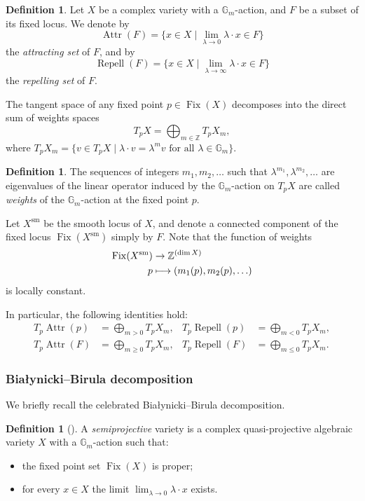 \documentclass[JEP,XML,SOM,Unicode, NoEqCountersInSection,NoFloatCountersInSection,published]{cedram}
\let\ts\textstyle
\newcommand\mto{\mathchoice{\longmapsto}{\mapsto}{\mapsto}{\mapsto}}
\theoremstyle{definition}
\newtheorem{defn}[thm]{Definition}
\newcommand{\Gm}{\mathbb{G}_m}
\newcommand{\Attr}{\operatorname{Attr}}
\newcommand{\Repell}{\operatorname{Repell}}
\newcommand{\Fix}{\operatorname{Fix}}
\begin{document}
\label{sec:attrrepell}
\begin{defn}
Let $X$ be a complex variety with a $\Gm$\nobreakdash-action, and $F$ be a subset of its fixed locus. We denote by
\[
\Attr(F)= \{ x \in X \mid \ts\lim_{\lambda \to 0} \lambda \cdot x \in F \}
\]
the \emph{attracting set} of $F$, and by
\[
\Repell(F)= \{ x \in X \mid\ts\lim_{\lambda \to \infty} \lambda \cdot x \in F \}
\]
the \emph{repelling set} of $F$.
\end{defn}

The tangent space of any fixed point $p \in \Fix(X)$ decomposes into the direct sum of weights spaces
\[
T_p X = \bigoplus_{m \in \mathbb{Z}} T_p X_{m},
\]
where $T_p X_m = \{ v \in T_p X \mid \lambda \cdot v = \lambda^m v \text{ for all }\lambda \in \Gm \}$.

\begin{defn}
The sequences of integers $m_1, m_2, \ldots$ such that $\lambda^{m_1}, \lambda^{m_2}, \ldots$ are eigenvalues of the linear operator induced by the $\Gm$\nobreakdash-action on $T_p X$ are called \emph{weights} of the $\Gm$\nobreakdash-action at the fixed point $p$.
\end{defn}
Let $X^{\mathrm{sm}}$ be the smooth locus of $X$, and denote a connected component of the fixed locus $\Fix(X^{\mathrm{sm}})$ simply by $F$. Note that the function of weights
\begin{align*}
\Fix(X^{\mathrm{sm}}) & \to \mathbb{Z}^{(\dim X)}\\
p & \mto (m_1(p), m_2(p), \ldots )
\end{align*} is locally constant.

In particular, the following identities hold:
\begin{align}\label{eq:dimTangattractor}
T_p \Attr(p)&= \bigoplus_{m>0} T_p X_{m},& T_p \Repell(p)&= \bigoplus_{m<0} T_p X_{m},
\\
\label{eq:dimensiontangentspace}
T_p \Attr(F)&= \bigoplus_{m\geq 0} T_p X_{m},& T_p \Repell(F)&= \bigoplus_{m\leq 0} T_p X_{m}.
\end{align}

\subsubsection{Białynicki--Birula decomposition}
We briefly recall the celebrated Białynicki--Birula decomposition.
\begin{defn}[{\cite[Def.\,1.1.1]{HauselVillegas15}}]
A \emph{semiprojective} variety is a complex quasi-projective algebraic variety $X$ with a $\Gm$\nobreakdash-action such that:
\begin{itemize}
\item the fixed point set $\Fix(X)$ is proper;
\item for every $x \in X$ the limit $\lim_{\lambda \to 0} \lambda \cdot x$ exists.
\end{itemize}
\end{defn}
\end{document}
